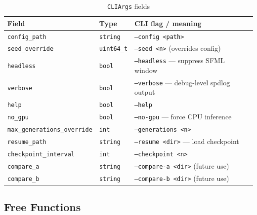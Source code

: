\begin{table}[H]
\centering\small
\caption{\texttt{CLIArgs} fields}
\begin{tabularx}{\textwidth}{@{}llX@{}}
\toprule
\textbf{Field} & \textbf{Type} & \textbf{CLI flag / meaning} \\
\midrule
\texttt{config\_path}               & \texttt{string}    & \texttt{--config <path>} \\
\texttt{seed\_override}             & \texttt{uint64\_t} & \texttt{--seed <n>} (overrides config) \\
\texttt{headless}                   & \texttt{bool}      & \texttt{--headless} — suppress SFML window \\
\texttt{verbose}                    & \texttt{bool}      & \texttt{--verbose} — debug-level spdlog output \\
\texttt{help}                       & \texttt{bool}      & \texttt{--help} \\
\texttt{no\_gpu}                    & \texttt{bool}      & \texttt{--no-gpu} — force CPU inference \\
\texttt{max\_generations\_override} & \texttt{int}       & \texttt{--generations <n>} \\
\texttt{resume\_path}               & \texttt{string}    & \texttt{--resume <dir>} — load checkpoint \\
\texttt{checkpoint\_interval}       & \texttt{int}       & \texttt{--checkpoint <n>} \\
\texttt{compare\_a}                 & \texttt{string}    & \texttt{--compare-a <dir>} (future use) \\
\texttt{compare\_b}                 & \texttt{string}    & \texttt{--compare-b <dir>} (future use) \\
\bottomrule
\end{tabularx}
\end{table}

\subsection{Free Functions}

